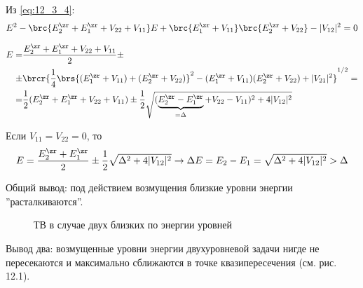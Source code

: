 Из \eqref{eq:12_3_4}:
$$
E^2 - \brc{E_2^\zr + E_1^\zr + V_{22} + V_{11}}E + \brc{E_1^\zr + V_{11}} \brc{E_2^\zr + V_{22}} - |V_{12}|^2 = 0
$$

\begin{equation*}
\begin{split}
E = &  \frac{E_2^\zr + E_1^\zr + V_{22} + V_{11}}{2} \pm\\
\pm & \brcr{\frac{1}{4} \brs{ (E_1^\zr + V_{11}) + (E_2^\zr + V_{22}) }^2  - (E_1^\zr + V_{11})(E_2^\zr + V_{22}) + |V_{21}|^2 }^{1/2} = \\
= & \frac{1}{2}(E_2^\zr + E_1^\zr + V_{22} + V_{11}) \pm \frac{1}{2} \sqrt{(\underbrace{E_2^\zr -E_1^\zr}_{=\Delta} + V_{22} - V_{11})^2 + 4 |V_{12}|^2}
\end{split}
\end{equation*}

Если $V_{11} = V_{22} = 0$, то 
$$
E=\frac{E_2^\zr + E_1^\zr}{2} \pm \frac{1}{2} \sqrt{\Delta^2 + 4 |V_{12}|^2} \to \Delta E = E_2 - E_1 = \sqrt{\Delta^2 + 4 |V_{12}|^2} > \Delta
$$

Общий вывод: под действием возмущения близкие уровни энергии ''расталкиваются''.

\begin{figure} [H]
\centering
{}
\caption{ТВ в случае двух близких по энергии уровней} \label{fig:12_1}
\end{figure}

Вывод два: возмущенные уровни энергии двухуровневой задачи нигде не пересекаются и максимально сближаются в точке квазипересечения (см. рис. 12.1).



